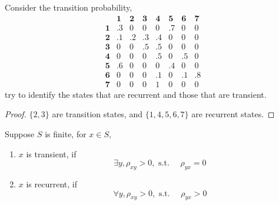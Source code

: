 \begin{example}
    Consider the transition probability,
    \begin{equation*}
        \begin{array}{cccccccc}
                       & \mathbf{1} & \mathbf{2} & \mathbf{3} & \mathbf{4} & \mathbf{5} & \mathbf{6} & \mathbf{7} \\
            \mathbf{1} & .3         & 0          & 0          & 0          & .7         & 0          & 0          \\
            \mathbf{2} & .1         & .2         & .3         & .4         & 0          & 0          & 0          \\
            \mathbf{3} & 0          & 0          & .5         & .5         & 0          & 0          & 0          \\
            \mathbf{4} & 0          & 0          & 0          & .5         & 0          & .5         & 0          \\
            \mathbf{5} & .6         & 0          & 0          & 0          & .4         & 0          & 0          \\
            \mathbf{6} & 0          & 0          & 0          & .1         & 0          & .1         & .8         \\
            \mathbf{7} & 0          & 0          & 0          & 1          & 0          & 0          & 0
        \end{array}
    \end{equation*}
    try to identify the states that are recurrent and those that are transient.
\end{example}

\begin{proof}
    $\{2,3\}$ are transition states, and $\{1,4,5,6,7\}$ are recurrent states.
\end{proof}

\begin{remark}
    Suppose $S$ is finite, for $x\in S$,
    \begin{enumerate}
        \item $x$ is transient, if
              \begin{equation*}
                  \exists y,\rho_{xy}>0,\text{ s.t. }\quad\rho_{yx}=0
              \end{equation*}
        \item $x$ is recurrent, if
              \begin{equation*}
                  \forall y,\rho_{xy}>0,\text{ s.t. }\quad\rho_{yx}>0
              \end{equation*}
    \end{enumerate}
\end{remark}

